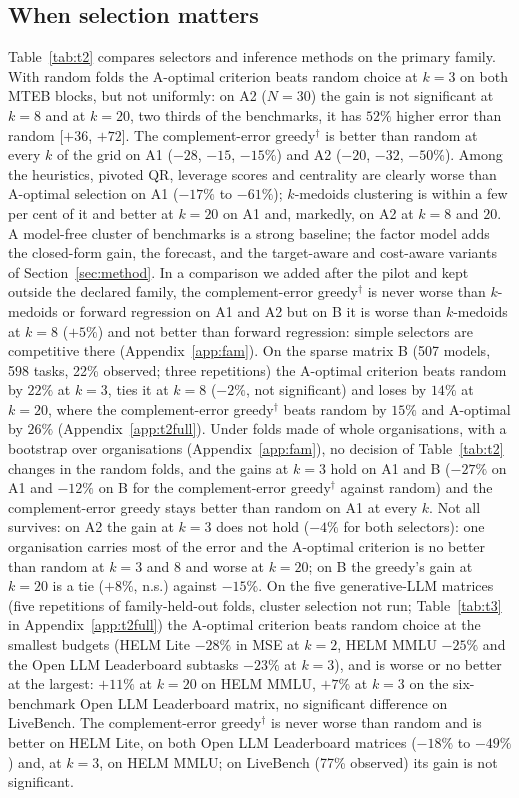 \subsection{When selection matters}
Table~\ref{tab:t2} compares selectors and inference methods on the primary family.
With random folds the A-optimal criterion beats random choice at $k=3$ on both MTEB blocks, but not uniformly: on A2 ($N=30$) the gain is not significant at $k=8$ and at $k=20$, two thirds of the benchmarks, it has $52\%$ higher error than random [$+36$, $+72$].
The complement-error greedy$^\dagger$ is better than random at every $k$ of the grid on A1 ($-28$, $-15$, $-15\%$) and A2 ($-20$, $-32$, $-50\%$).
Among the heuristics, pivoted QR, leverage scores and centrality are clearly worse than A-optimal selection on A1 ($-17\%$ to $-61\%$); $k$-medoids clustering is within a few per cent of it and better at $k=20$ on A1 and, markedly, on A2 at $k=8$ and $20$.
A model-free cluster of benchmarks is a strong baseline; the factor model adds the closed-form gain, the forecast, and the target-aware and cost-aware variants of Section~\ref{sec:method}.
In a comparison we added after the pilot and kept outside the declared family, the complement-error greedy$^\dagger$ is never worse than $k$-medoids or forward regression on A1 and A2 but on B it is worse than $k$-medoids at $k=8$ ($+5\%$) and not better than forward regression: simple selectors are competitive there (Appendix~\ref{app:fam}).
On the sparse matrix B (507 models, 598 tasks, 22\% observed; three repetitions) the A-optimal criterion beats random by $22\%$ at $k=3$, ties it at $k=8$ ($-2\%$, not significant) and loses by $14\%$ at $k=20$, where the complement-error greedy$^\dagger$ beats random by $15\%$ and A-optimal by $26\%$ (Appendix~\ref{app:t2full}).
Under folds made of whole organisations, with a bootstrap over organisations (Appendix~\ref{app:fam}), no decision of Table~\ref{tab:t2} changes in the random folds, and the gains at $k=3$ hold on A1 and B ($-27\%$ on A1 and $-12\%$ on B for the complement-error greedy$^\dagger$ against random) and the complement-error greedy stays better than random on A1 at every $k$.
Not all survives: on A2 the gain at $k=3$ does not hold ($-4\%$ for both selectors): one organisation carries most of the error and the A-optimal criterion is no better than random at $k=3$ and $8$ and worse at $k=20$; on B the greedy's gain at $k=20$ is a tie ($+8\%$, n.s.) against $-15\%$.
On the five generative-LLM matrices (five repetitions of family-held-out folds, cluster selection not run; Table~\ref{tab:t3} in Appendix~\ref{app:t2full}) the A-optimal criterion beats random choice at the smallest budgets (HELM Lite $-28\%$ in MSE at $k=2$, HELM MMLU $-25\%$ and the Open LLM Leaderboard subtasks $-23\%$ at $k=3$), and is worse or no better at the largest: $+11\%$ at $k=20$ on HELM MMLU, $+7\%$ at $k=3$ on the six-benchmark Open LLM Leaderboard matrix, no significant difference on LiveBench.
The complement-error greedy$^\dagger$ is never worse than random and is better on HELM Lite, on both Open LLM Leaderboard matrices ($-18\%$ to $-49\%$) and, at $k=3$, on HELM MMLU; on LiveBench (77\% observed) its gain is not significant.

